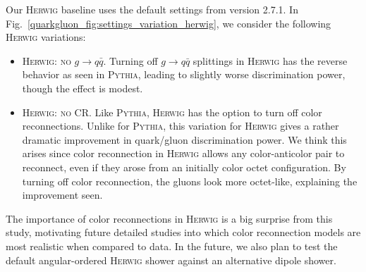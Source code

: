 \documentclass[11pt]{cernrep}
\begin{document}
Our \textsc{Herwig} baseline uses the default settings from version 2.7.1.  In Fig.~\ref{quarkgluon_fig:settings_variation_herwig}, we consider the following  \textsc{Herwig} variations:
\begin{itemize}
\item \textsc{Herwig: no $g \to q\bar{q}$}.  Turning off $g \to q \bar{q}$ splittings in \textsc{Herwig} has the reverse behavior as seen in \textsc{Pythia}, leading to slightly worse discrimination power, though the effect is modest.
\item \textsc{Herwig: no CR}.  Like \textsc{Pythia}, \textsc{Herwig} has the option to turn off color reconnections.  Unlike for \textsc{Pythia}, this variation for \textsc{Herwig} gives a rather dramatic improvement in quark/gluon discrimination power.  We think this arises since color reconnection in \textsc{Herwig} allows any color-anticolor pair to reconnect, even if they arose from an initially color octet configuration.  By turning off color reconnection, the gluons look more octet-like, explaining the improvement seen.
\end{itemize}
The importance of color reconnections in \textsc{Herwig} is a big surprise from this study, motivating future detailed studies into which color reconnection models are most realistic when compared to data.  In the future, we also plan to test the default angular-ordered \textsc{Herwig} shower against an alternative dipole shower.
\end{document}
